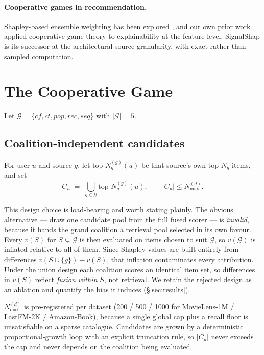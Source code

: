 \documentclass[11pt]{article}
\newcommand{\G}{\mathcal{G}}
\newcommand{\Cu}{C_u}
\begin{document}
\paragraph{Cooperative games in recommendation.}
Shapley-based ensemble weighting has been explored \citep{rozemberczki2022shapley},
and our own prior work applied cooperative game theory to explainability at the
feature level. SignalShap is its successor at the architectural-source
granularity, with exact rather than sampled computation.

\section{The Cooperative Game}\label{sec:game}

Let $\G = \{cf, ct, pop, rec, seq\}$ with $|\G| = 5$.

\subsection{Coalition-independent candidates}

For user $u$ and source $g$, let $\text{top-}N_g^{(g)}(u)$ be that source's own
top-$N_g$ items, and set
\begin{equation}
\Cu \;=\; \bigcup_{g \in \G} \text{top-}N_g^{(g)}(u),
\qquad |\Cu| \le N_{\max}^{(d)} .
\end{equation}

This design choice is load-bearing and worth stating plainly. The obvious
alternative --- draw one candidate pool from the full fused scorer --- is
\emph{invalid}, because it hands the grand coalition a retrieval pool selected
in its own favour. Every $v(S)$ for $S \subsetneq \G$ is then evaluated on
items chosen to suit $\G$, so $v(\G)$ is inflated relative to all of them.
Since Shapley values are built entirely from differences
$v(S \cup \{g\}) - v(S)$, that inflation contaminates every attribution. Under
the union design each coalition scores an identical item set, so differences in
$v(S)$ reflect \emph{fusion within $S$}, not retrieval. We retain the rejected
design as an ablation and quantify the bias it induces
(\S\ref{sec:results}).

$N_{\max}^{(d)}$ is pre-registered per dataset (200 / 500 / 1000 for
MovieLens-1M / LastFM-2K / Amazon-Book), because a single global cap plus a
recall floor is unsatisfiable on a sparse catalogue. Candidates are grown by a
deterministic proportional-growth loop with an explicit truncation rule, so
$|\Cu|$ never exceeds the cap and never depends on the coalition being
evaluated.
\end{document}

